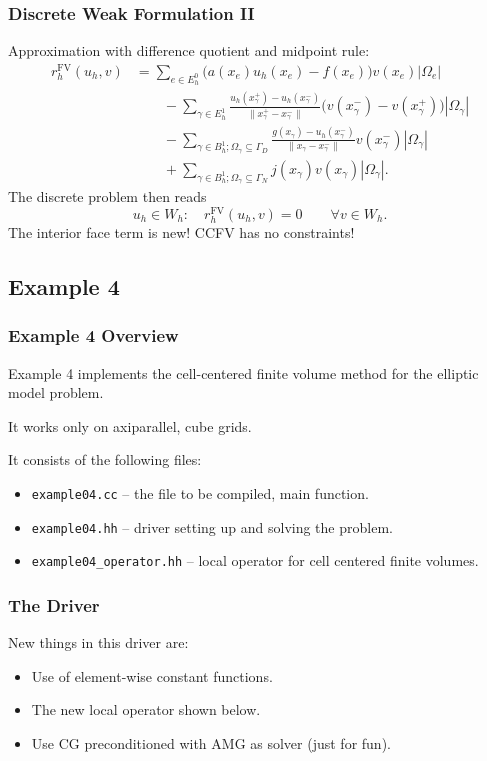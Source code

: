 \begin{frame}
\frametitle{Discrete Weak Formulation II}
Approximation with difference quotient and midpoint rule:
\begin{equation*}
\begin{split}
r_h^{\text{FV}}(u_h,v) & = \sum_{e\in E_h^0} \bigl(a(x_e)u_h(x_e) - f(x_e)\bigr) v(x_e) |\Omega_e|\\
&\qquad - \sum_{\gamma\in E_h^1} \frac{u_h(x_\gamma^+)-u_h(x_\gamma^-)}{\|x_\gamma^+ - x_\gamma^-\|}
\bigl(v(x_\gamma^-) - v(x_\gamma^+)\bigr) |\Omega_\gamma|\\
&\qquad - \sum_{\gamma\in B_h^1; \Omega_\gamma\subseteq\Gamma_D} \frac{g(x_\gamma)-u_h(x_\gamma^-)}{\|x_\gamma - x_\gamma^-\|}
v(x_\gamma^-) |\Omega_\gamma|\\
&\qquad + \sum_{\gamma\in B_h^1; \Omega_\gamma\subseteq\Gamma_N} j(x_\gamma) v(x_\gamma) |\Omega_\gamma| .
\end{split}
\end{equation*}
The discrete problem then reads
\begin{equation*}
u_h \in W_h : \quad r_h^{\text{FV}}(u_h,v) = 0 \qquad \forall v \in W_h.
\end{equation*}
The interior face term is new! CCFV has no constraints!
\end{frame}

\subsection{Example 4}

\begin{frame}
\frametitle{Example 4 Overview}
Example 4 implements the cell-centered finite volume method for the elliptic model problem.

It works only on axiparallel, cube grids.

It consists of the following files:
\begin{itemize}
\item \lstinline{example04.cc} -- the file to be compiled, main function.
\item \lstinline{example04.hh} -- driver setting up and solving the problem.
\item \lstinline{example04_operator.hh} -- local operator for cell centered finite volumes.
\end{itemize}
\end{frame}

\begin{frame}
\frametitle{The Driver}
New things in this driver are:
\begin{itemize}
\item Use of element-wise constant functions.
\item The new local operator shown below.
\item Use CG preconditioned with AMG as solver (just for fun).
\end{itemize}
\end{frame}

